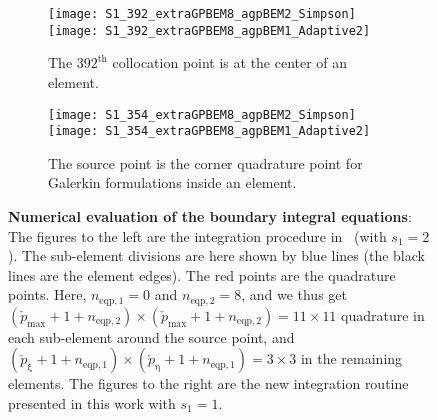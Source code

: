 \begin{figure}
	\begin{subfigure}[t]{\textwidth}
		\centering
		\texttt{[image: S1\_392\_extraGPBEM8\_agpBEM2\_Simpson]}%
		\hspace*{0.02\textwidth}%
		\texttt{[image: S1\_392\_extraGPBEM8\_agpBEM1\_Adaptive2]}
		\caption{The $392^{\mathrm{th}}$ collocation point is at the center of an element.}
	\end{subfigure}
	\par\bigskip
	\par\bigskip
	\begin{subfigure}[t]{\textwidth}
		\centering
		\texttt{[image: S1\_354\_extraGPBEM8\_agpBEM2\_Simpson]}%
		\hspace*{0.02\textwidth}%
		\texttt{[image: S1\_354\_extraGPBEM8\_agpBEM1\_Adaptive2]}
		\caption{The source point is the corner quadrature point for Galerkin formulations inside an element.}
	\end{subfigure}
	\caption{\textbf{Numerical evaluation of the boundary integral equations}: The figures to the left are the integration procedure in~\cite{Simpson2014aib} (with $s_1=2$). The sub-element divisions are here shown by blue lines (the black lines are the element edges). The red points are the quadrature points. Here, $n_{\mathrm{eqp},1}=0$ and $n_{\mathrm{eqp},2}=8$, and we thus get $(\check{p}_{\mathrm{max}}+1+n_{\mathrm{eqp},2})\times(\check{p}_{\mathrm{max}}+1+n_{\mathrm{eqp},2})=11\times 11$ quadrature in each sub-element around the source point, and $(\check{p}_\upxi+1+n_{\mathrm{eqp},1})\times(\check{p}_\upeta+1+n_{\mathrm{eqp},1})=3\times 3$ in the remaining elements. The figures to the right are the new integration routine presented in this work with $s_1=1$.}
	\label{Fig3:Quadrature2}
\end{figure}